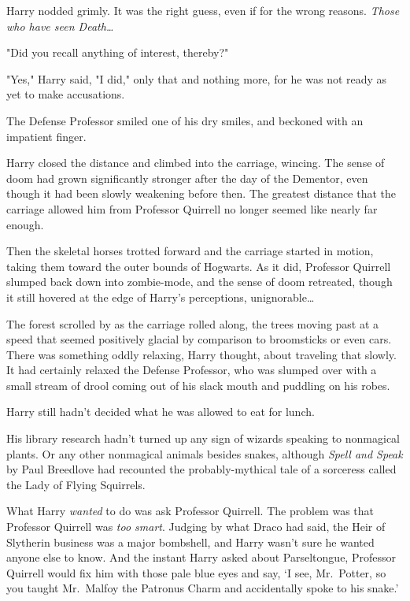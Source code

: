 Harry nodded grimly. It was the right guess, even if for the wrong reasons.
\emph{Those who have seen Death{\ldots}}

"Did you recall anything of interest, thereby?"

"Yes," Harry said, "I did," only that and nothing more, for he was not ready as
yet to make accusations.

The Defense Professor smiled one of his dry smiles, and beckoned with an
impatient finger.

Harry closed the distance and climbed into the carriage, wincing. The sense of
doom had grown significantly stronger after the day of the Dementor, even
though it had been slowly weakening before then. The greatest distance that the
carriage allowed him from Professor Quirrell no longer seemed like nearly far
enough.

Then the skeletal horses trotted forward and the carriage started in motion,
taking them toward the outer bounds of Hogwarts. As it did, Professor Quirrell
slumped back down into zombie-mode, and the sense of doom retreated, though it
still hovered at the edge of Harry's perceptions, unignorable{\ldots}

The forest scrolled by as the carriage rolled along, the trees moving past at a
speed that seemed positively glacial by comparison to broomsticks or even cars.
There was something oddly relaxing, Harry thought, about traveling that slowly.
It had certainly relaxed the Defense Professor, who was slumped over with a
small stream of drool coming out of his slack mouth and puddling on his robes.

Harry still hadn't decided what he was allowed to eat for lunch.

His library research hadn't turned up any sign of wizards speaking to
nonmagical plants. Or any other nonmagical animals besides snakes, although
\emph{Spell and Speak} by Paul Breedlove had recounted the probably-mythical
tale of a sorceress called the Lady of Flying Squirrels.

What Harry \emph{wanted} to do was ask Professor Quirrell. The problem was that
Professor Quirrell was \emph{too smart}. Judging by what Draco had said, the
Heir of Slytherin business was a major bombshell, and Harry wasn't sure he
wanted anyone else to know. And the instant Harry asked about Parseltongue,
Professor Quirrell would fix him with those pale blue eyes and say, `I see,
Mr.~Potter, so you taught Mr.~Malfoy the Patronus Charm and accidentally spoke
to his snake.'

